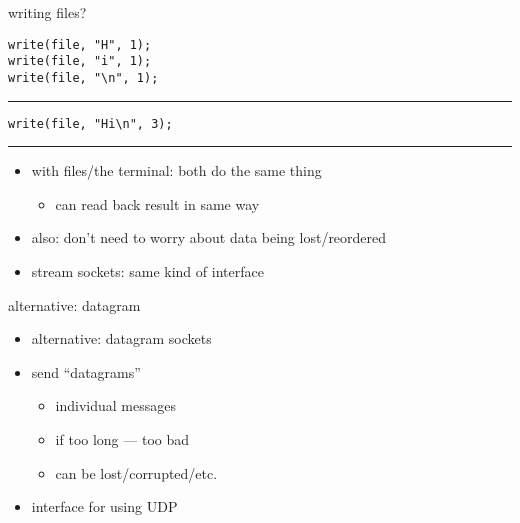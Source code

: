 \begin{frame}[fragile]{writing files?}
\lstset{language=C,style=small}
\begin{lstlisting}
write(file, "H", 1);
write(file, "i", 1);
write(file, "\n", 1);
\end{lstlisting}
\hrule
\begin{lstlisting}
write(file, "Hi\n", 3);
\end{lstlisting}
\hrule
\begin{itemize}
    \item with files/the terminal: both do the same thing
        \begin{itemize}
        \item can read back result in same way
        \end{itemize}
    \item also: don't need to worry about data being lost/reordered
    \item stream sockets: same kind of interface
\end{itemize}
\end{frame}


\begin{frame}{alternative: datagram}
    \begin{itemize}
    \item alternative: datagram sockets
    \item send ``datagrams''
        \begin{itemize}
        \item individual messages
        \item if too long --- too bad
        \item can be lost/corrupted/etc.
        \end{itemize}
    \item interface for using UDP
    \end{itemize}
\end{frame}
